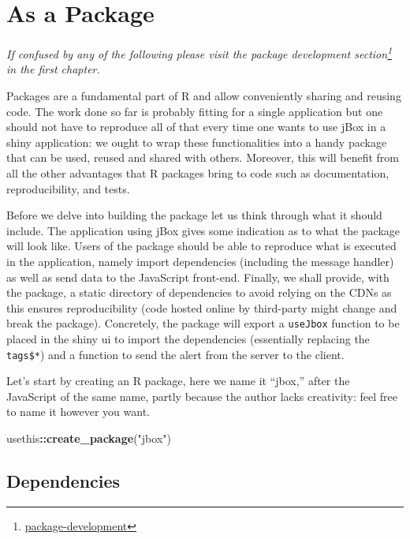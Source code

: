 \documentclass[
]{krantz}
\makeatletter
\newenvironment{Shaded}{\begin{snugshade}}{\end{snugshade}}
\newcommand{\KeywordTok}[1]{\textcolor[rgb]{0.27,0.27,0.27}{\textbf{#1}}}
\newcommand{\NormalTok}[1]{#1}
\newcommand{\OperatorTok}[1]{\textcolor[rgb]{0.43,0.43,0.43}{\textbf{#1}}}
\newcommand{\StringTok}[1]{\textcolor[rgb]{0.5,0.5,0.5}{#1}}
\renewcommand{\href}[2]{#2\footnote{\url{#1}}}
\newenvironment{kframe}{%
\medskip{}
\setlength{\fboxsep}{.8em}
 \def\at@end@of@kframe{}%
 \ifinner\ifhmode%
  \def\at@end@of@kframe{\end{minipage}}%
  \begin{minipage}{\columnwidth}%
 \fi\fi%
 \def\FrameCommand##1{\hskip\@totalleftmargin \hskip-\fboxsep
 \colorbox{shadecolor}{##1}\hskip-\fboxsep
     \hskip-\linewidth \hskip-\@totalleftmargin \hskip\columnwidth}%
 \MakeFramed {\advance\hsize-\width
   \@totalleftmargin\z@ \linewidth\hsize
   \@setminipage}}%
 {\par\unskip\endMakeFramed%
 \at@end@of@kframe}
\renewenvironment{Shaded}{\begin{kframe}}{\end{kframe}}
\makeatother
\begin{document}
\hypertarget{as-a-package}{%
\section*{As a Package}\label{as-a-package}}


\emph{If confused by any of the following please visit the \href{package-development}{package development section} in the first chapter.}

Packages are a fundamental part of R and allow conveniently sharing and reusing code. The work done so far is probably fitting for a single application but one should not have to reproduce all of that every time one wants to use jBox in a shiny application: we ought to wrap these functionalities into a handy package that can be used, reused and shared with others. Moreover, this will benefit from all the other advantages that R packages bring to code such as documentation, reproducibility, and tests.

Before we delve into building the package let us think through what it should include. The application using jBox gives some indication as to what the package will look like. Users of the package should be able to reproduce what is executed in the application, namely import dependencies (including the message handler) as well as send data to the JavaScript front-end. Finally, we shall provide, with the package, a static directory of dependencies to avoid relying on the CDNs as this ensures reproducibility (code hosted online by third-party might change and break the package). Concretely, the package will export a \texttt{useJbox} function to be placed in the shiny ui to import the dependencies (essentially replacing the \texttt{tags\$*}) and a function to send the alert from the server to the client.

Let's start by creating an R package, here we name it ``jbox,'' after the JavaScript of the same name, partly because the author lacks creativity: feel free to name it however you want.

\begin{Shaded}
\begin{Highlighting}[]
\NormalTok{usethis}\OperatorTok{::}\KeywordTok{create\_package}\NormalTok{(}\StringTok{"jbox"}\NormalTok{)}
\end{Highlighting}
\end{Shaded}

\hypertarget{dependencies}{%
\subsection*{Dependencies}\label{dependencies}}
\end{document}
